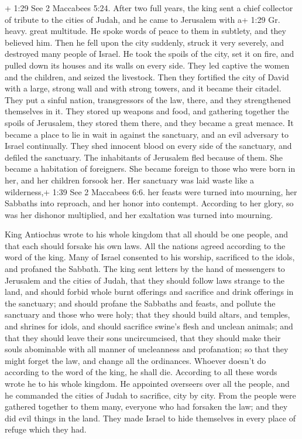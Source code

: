  + 1:29 See 2 Maccabees 5:24. After two full years, the
king sent a chief collector of tribute to the cities of Judah, and he
came to Jerusalem with a+ 1:29 Gr. heavy. great multitude. 
He spoke words of peace to them in subtlety, and they believed him. Then
he fell upon the city suddenly, struck it very severely, and destroyed
many people of Israel.  He took the spoils of the city, set
it on fire, and pulled down its houses and its walls on every side.
 They led captive the women and the children, and seized
the livestock.  Then they fortified the city of David with
a large, strong wall and with strong towers, and it became their
citadel.  They put a sinful nation, transgressors of the
law, there, and they strengthened themselves in it.  They
stored up weapons and food, and gathering together the spoils of
Jerusalem, they stored them there, and they became a great menace.
 It became a place to lie in wait in against the sanctuary,
and an evil adversary to Israel continually.  They shed
innocent blood on every side of the sanctuary, and defiled the
sanctuary.  The inhabitants of Jerusalem fled because of
them. She became a habitation of foreigners. She became foreign to those
who were born in her, and her children forsook her.  Her
sanctuary was laid waste like a wilderness,+ 1:39 See 2 Maccabees 6:6.
her feasts were turned into mourning, her Sabbaths into reproach, and
her honor into contempt.  According to her glory, so was
her dishonor multiplied, and her exaltation was turned into mourning.

 King Antiochus wrote to his whole kingdom that all should
be one people,  and that each should forsake his own laws.
All the nations agreed according to the word of the king. 
Many of Israel consented to his worship, sacrificed to the idols, and
profaned the Sabbath.  The king sent letters by the hand of
messengers to Jerusalem and the cities of Judah, that they should follow
laws strange to the land,  and should forbid whole burnt
offerings and sacrifice and drink offerings in the sanctuary; and should
profane the Sabbaths and feasts,  and pollute the sanctuary
and those who were holy;  that they should build altars,
and temples, and shrines for idols, and should sacrifice swine's flesh
and unclean animals;  and that they should leave their sons
uncircumcised, that they should make their souls abominable with all
manner of uncleanness and profanation;  so that they might
forget the law, and change all the ordinances.  Whoever
doesn't do according to the word of the king, he shall die.
 According to all these words wrote he to his whole
kingdom. He appointed overseers over all the people, and he commanded
the cities of Judah to sacrifice, city by city.  From the
people were gathered together to them many, everyone who had forsaken
the law; and they did evil things in the land.  They made
Israel to hide themselves in every place of refuge which they had.

